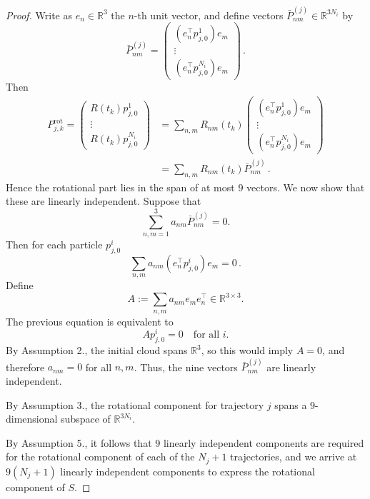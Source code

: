 \documentclass[10pt,a4paper]{amsart}
\newcommand{\R}{\mathbb{R}}                                 %
\newcommand{\pmat}[1]{\begin{pmatrix}#1\end{pmatrix}}
\begin{document}
\begin{proof}
    Write as $e_n \in \R^3$ the $n$-th unit vector, and define vectors $\bar P^{(j)}_{nm} \in \mathbb{R}^{3N_i}$ by
    \begin{equation}
        \bar P^{(j)}_{nm}
        =
        \begin{pmatrix}
        (e_n^\top p^1_{j,0}) e_m \\
        \vdots \\
        (e_n^\top p^{N_i}_{j,0}) e_m
        \end{pmatrix}\,.
    \end{equation}
    Then
    \begin{align}
        P^{\mathrm{rot}}_{j,k} = 
            \pmat{
            R(t_k)p^1_{j,0} \\ 
            \vdots \\
            R(t_k)p^{N_i}_{j,0} }
        &= \sum_{n,m} R_{nm}(t_k)
            \pmat{ 
            (e_n^\top p^1_{j,0}) e_m \\
            \vdots \\
            (e_n^\top p^{N_i}_{j,0}) e_m } \\ 
        &= \sum_{n,m} R_{nm}(t_k) \bar{P}^{(j)}_{nm} \,.
    \end{align}
    Hence the rotational part lies in the span of at most $9$ vectors. We now show that these are linearly independent. Suppose that
    \begin{equation}
    \sum_{n,m=1}^{3} a_{nm}\bar P^{(j)}_{nm}=0.
    \end{equation}
    Then for each particle $p^i_{j,0}$
    \begin{equation}
    \sum_{n,m} a_{nm}(e_n^\top p^i_{j,0}) e_m = 0\,.
    \end{equation}
    Define
    \begin{equation}
    A := \sum_{n,m} a_{nm} e_m e_n^\top \in \mathbb{R}^{3\times3}.
    \end{equation}
    The previous equation is equivalent to
    \begin{equation}
    A p^i_{j,0} = 0 \quad \text{for all } i.
    \end{equation}
    By Assumption 2., the initial cloud spans $\mathbb{R}^3$, so this would imply $A=0$, and therefore $a_{nm}=0$ for all $n,m$. Thus, the nine vectors $\bar P^{(j)}_{nm}$ are linearly independent.

    By Assumption 3., the rotational component for trajectory $j$ spans a $9$-dimensional subspace of $\mathbb{R}^{3N_i}$.

    By Assumption 5., it follows that $9$ linearly independent components are required for the rotational component of each of the $N_j + 1$ trajectories, and we arrive at $9(N_j+1)$ linearly independent components to express the rotational component of $S$. 
    

\end{proof}
\end{document}
